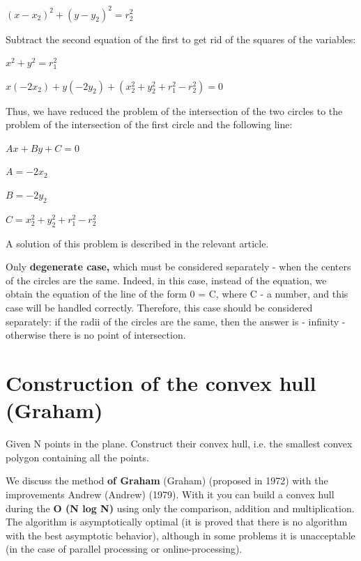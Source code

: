 $(x - x_2)^2 + (y - y_2)^2 = r_2^2$

Subtract the second equation of the first to get rid of the squares of the variables:

$x^2 + y^2 = r_1^2$

$x (-2x_2) + y (-2y_2) + (x_2^2 + y_2^2 + r_1^2 - r_2^2) = 0$

Thus, we have reduced the problem of the intersection of the two circles to the problem of the intersection of the first circle and the following line:

$Ax + By + C = 0$

$A =-2x_2$

$B =-2y_2$

$C = x_2^2 + y_2^2 + r_1^2 - r_2^2$

A solution of this problem is described in the relevant article.

Only \textbf{degenerate case,} which must be considered separately - when the centers of the circles are the same. Indeed, in this case, instead of the equation, we obtain the equation of the line of the form 0 = C, where C - a number, and this case will be handled correctly. Therefore, this case should be considered separately: if the radii of the circles are the same, then the answer is - infinity - otherwise there is no point of intersection.

\section{ Construction of the convex hull (Graham) }
Given N points in the plane. Construct their convex hull, i.e. the smallest convex polygon containing all the points.

We discuss the method \textbf{of Graham} (Graham) (proposed in 1972) with the improvements Andrew (Andrew) (1979). With it you can build a convex hull during the \textbf{O (N log N)} using only the comparison, addition and multiplication. The algorithm is asymptotically optimal (it is proved that there is no algorithm with the best asymptotic behavior), although in some problems it is unacceptable (in the case of parallel processing or online-processing).

